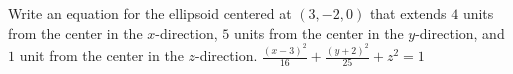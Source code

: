 {Write an equation for the ellipsoid centered at $(3,-2,0)$ that extends $4$ units from the center in the $x$-direction, $5$ units from the center in the $y$-direction, and $1$ unit from the center in the $z$-direction.
}
{$\frac{(x-3)^2}{16}+ \frac{(y+2)^2}{25} +z^2 = 1$
}
